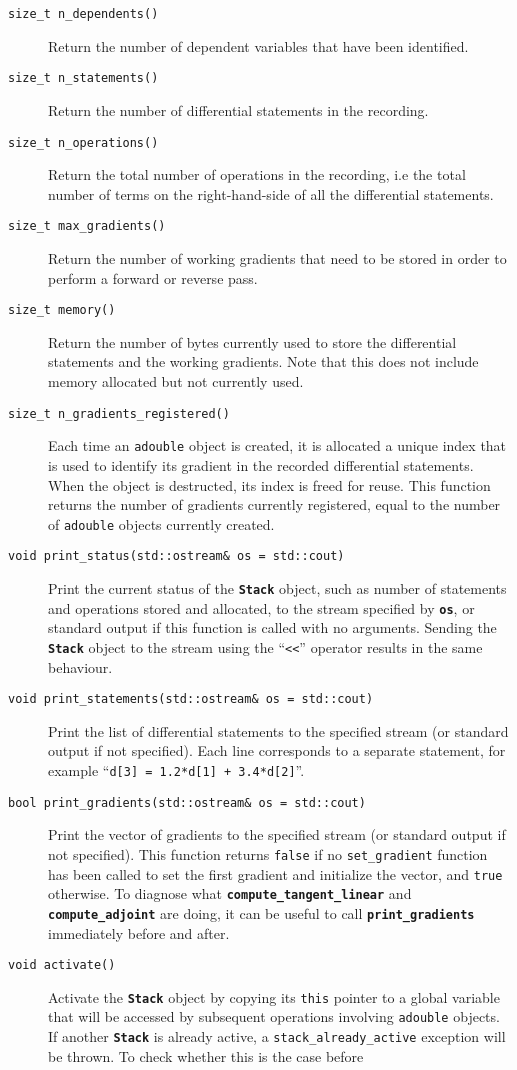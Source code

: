 \documentclass[a4,oneside]{book}
\def\codesize{\small}
\def\code#1{{\codesize\texttt{#1}}}
\def\codebf#1{{\codesize\texttt{\textbf{#1}}}}
\def\citem#1{\item[{\codesize\texttt{#1}}]}
\def\Offset{size\_t}
\begin{document}
\begin{description}
%
\citem{\Offset\ n\_dependents()} Return the number of dependent
variables that have been identified.
%
\citem{\Offset\ n\_statements()} Return the number of differential
statements in the recording.
%
\citem{\Offset\ n\_operations()} Return the total number of operations
in the recording, i.e the total number of terms on the right-hand-side
of all the differential statements.
%
\citem{\Offset\ max\_gradients()} Return the number of working gradients
that need to be stored in order to perform a forward or reverse pass.
%
\citem{size\_t memory()} Return the number of bytes currently
used to store the differential statements and the working
gradients. Note that this does not include memory allocated but not
currently used.
%
\citem{\Offset\ n\_gradients\_registered()} Each time an
\code{adouble} object is created, it is allocated a unique index that
is used to identify its gradient in the recorded differential
statements. When the object is destructed, its index is freed for
reuse. This function returns the number of gradients currently
registered, equal to the number of \code{adouble} objects currently
created.
%
\citem{void print\_status(std::ostream\&\ os = std::cout)} Print the
current status of the \codebf{Stack} object, such as number of
statements and operations stored and allocated, to the stream
specified by \codebf{os}, or standard output if this function is
called with no arguments.  Sending the \codebf{Stack} object to the
stream using the ``\code{<<}'' operator results in the same behaviour.
%
\citem{void print\_statements(std::ostream\&\ os = std::cout)} Print
the list of differential statements to the specified stream (or
standard output if not specified). Each line corresponds to a separate
statement, for example ``\code{d[3] = 1.2*d[1] + 3.4*d[2]}''.
%
\citem{bool print\_gradients(std::ostream\&\ os = std::cout)} Print
the vector of gradients to the specified stream (or standard output if
not specified). This function returns
\code{false} if no \code{set\_gradient}
function has been called to set the first gradient and initialize the
vector, and \code{true} otherwise. To diagnose what
\codebf{compute\_tangent\_linear} and 
\codebf{compute\_adjoint} are doing, it can be useful to call
\codebf{print\_gradients} immediately before and after.
%
\citem{void activate()} Activate the \codebf{Stack} object by copying
its \code{this} pointer to a global variable that will be accessed by
subsequent operations involving \code{adouble} objects.  If another
\codebf{Stack} is already active, a \code{stack\_already\_active}
exception will be thrown. To check whether this is the case before

\end{description}
\end{document}
